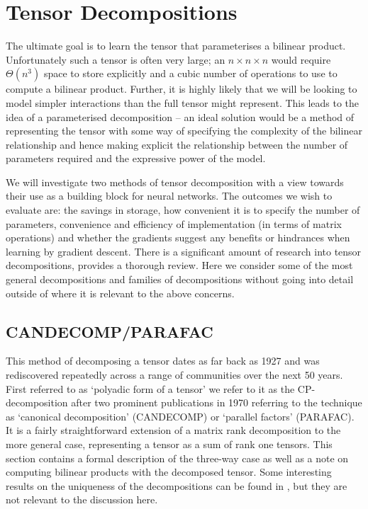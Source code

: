 {\section{Tensor Decompositions}
The ultimate goal is to learn the tensor that parameterises a bilinear product. Unfortunately
such a tensor is often very large; an \(n \times n \times n\) would require \(\Theta(n^3)\) space
to store explicitly and a cubic number of operations to use to compute a bilinear product. Further,
it is highly likely that we will be looking to model simpler interactions than the full tensor
might represent. This leads to the idea of a parameterised decomposition -- an ideal solution
would be a method of representing the tensor with some way of specifying the complexity of the
bilinear relationship and hence making explicit the relationship between the number of parameters
required and the expressive power of the model. 

We will investigate two methods of tensor decomposition with a view towards their use as a building
block for neural networks. The outcomes we wish to evaluate are: the savings in storage, how
convenient it is to specify the number of parameters, convenience and efficiency of implementation
(in terms of matrix operations) and whether the gradients suggest any benefits or hindrances when
learning by gradient descent. There is a significant amount of research into tensor decompositions,
\autocite{Kolda2009} provides a thorough review. Here we consider some of the most general
decompositions and families of decompositions without going into detail outside of where it is
relevant to the above concerns.

\subsection{CANDECOMP/PARAFAC}
This method of decomposing a tensor dates as far back as 1927 
\autocite{Hitchcock1927, Hitchcock1928} and was rediscovered repeatedly across a range of
communities over the next 50 years. \autocite{Kolda2009} First referred to as `polyadic
form of a tensor' we refer to it as the CP-decomposition after two prominent publications in
1970 referring to the technique as `canonical decomposition' (CANDECOMP) \autocite{Carroll1970}
 or `parallel factors' (PARAFAC). \autocite{Harshman1970}
 It is a fairly straightforward
extension of a matrix rank decomposition to the more general case, representing a tensor as
a sum of rank one tensors. This section contains a formal description of the three-way case
as well as a note on computing bilinear products with the decomposed tensor.
Some interesting results on the uniqueness of the decompositions can be found in \autocite{Kolda2009},
but they are not relevant to the discussion here.

}
